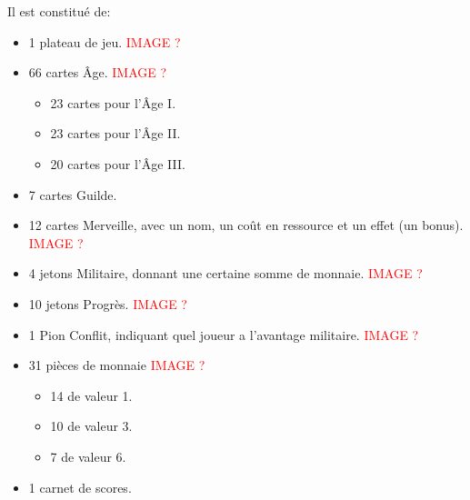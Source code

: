 \documentclass[a4paper, 12pt, french]{article}
\begin{document}
	Il est constitué de:
	\begin{itemize}
		\item 1 plateau de jeu. \textcolor{red}{IMAGE ?}
		\item 66 cartes Âge. \textcolor{red}{IMAGE ?}
		\begin{itemize}
			\item 23 cartes pour l'Âge I.
			\item 23 cartes pour l'Âge II.
			\item 20 cartes pour l'Âge III.
		\end{itemize}
		\item 7 cartes Guilde.
		\item 12 cartes Merveille, avec un nom, un coût en ressource et un effet (un bonus). \textcolor{red}{IMAGE ?}
		\item 4 jetons Militaire, donnant une certaine somme de monnaie. \textcolor{red}{IMAGE ?}
		\item 10 jetons Progrès. \textcolor{red}{IMAGE ?}
		\item 1 Pion Conflit, indiquant quel joueur a l'avantage militaire. \textcolor{red}{IMAGE ?}
		\item 31 pièces de monnaie \textcolor{red}{IMAGE ?}
		\begin{itemize}
			\item 14 de valeur 1.
			\item 10 de valeur 3.
			\item 7 de valeur 6.
		\end{itemize}
		\item 1 carnet de scores.
	\end{itemize}
\end{document}
